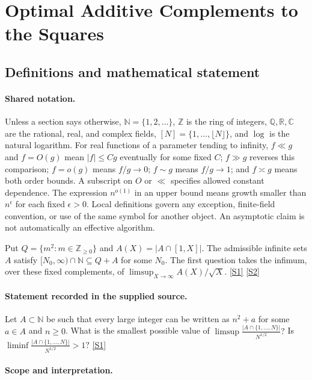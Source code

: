 \documentclass[11pt,a4paper]{article}
\newcommand{\N}{\mathbb{N}}
\newcommand{\Z}{\mathbb{Z}}
\newcommand{\Q}{\mathbb{Q}}
\newcommand{\R}{\mathbb{R}}
\newcommand{\C}{\mathbb{C}}
\newcommand{\sref}[2]{\hyperlink{source:#1:#2}{[S#2]}}
\begin{document}
\section{Optimal Additive Complements to the Squares}\label{statement}


\subsection{Definitions and mathematical statement}

\paragraph{Shared notation.}Unless a section says otherwise, $\N=\{1,2,\ldots\}$,
$\Z$ is the ring of integers, $\Q,\R,\C$ are the rational, real, and complex
fields, $[N]=\{1,\ldots,\lfloor N\rfloor\}$, and $\log$ is the natural
logarithm. For real functions of a parameter tending to infinity,
$f\ll g$ and $f=O(g)$ mean $|f|\leq Cg$ eventually for some fixed $C$;
$f\gg g$ reverses this comparison; $f=o(g)$ means $f/g\to0$;
$f\sim g$ means $f/g\to1$; and $f\asymp g$ means both order bounds.
A subscript on $O$ or $\ll$ specifies allowed constant dependence.
The expression $n^{o(1)}$ in an upper bound means growth smaller than
$n^\epsilon$ for each fixed $\epsilon>0$. Local definitions govern any
exception, finite-field convention, or use of the same symbol for another
object. An asymptotic claim is not automatically an effective algorithm.



Put $Q=\{m^2:m\in\Z_{\geq0}\}$ and $A(X)=|A\cap[1,X]|$. The admissible infinite sets $A$ satisfy $[N_0,\infty)\cap\N\subseteq Q+A$ for some $N_0$. The first question takes the infimum, over these fixed complements, of $\limsup_{X\to\infty}A(X)/\sqrt X$. \sref{statement}{1} \sref{statement}{2}

\paragraph{Statement recorded in the supplied source.}
Let $A\subset\mathbb{N}$ be such that every large integer can be written as $n^2+a$ for some $a\in A$ and $n\geq 0$. What is the smallest possible value of $ \limsup \frac{\lvert A\cap\{1,\ldots,N\}\rvert}{N^{1/2}}? $ Is $ \liminf \frac{\lvert A\cap\{1,\ldots,N\}\rvert}{N^{1/2}}>1? $ \sref{statement}{1}

\paragraph{Scope and interpretation.}
\end{document}
